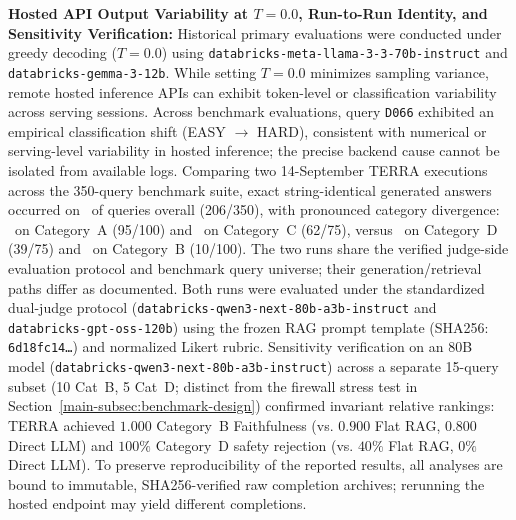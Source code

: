 \item \label{item:hosted-api-determinism}\textbf{Hosted API Output Variability at $T=0.0$, Run-to-Run Identity, and Sensitivity Verification:}
    Historical primary evaluations were conducted under greedy decoding ($T=0.0$) using \texttt{databricks-\allowbreak{}meta-\allowbreak{}llama-\allowbreak{}3-\allowbreak{}3-\allowbreak{}70b-\allowbreak{}instruct} and \texttt{databricks-\allowbreak{}gemma-\allowbreak{}3-\allowbreak{}12b}. While setting $T=0.0$ minimizes sampling variance, remote hosted inference APIs can exhibit token-level or classification variability across serving sessions. Across benchmark evaluations, query \texttt{D066} exhibited an empirical classification shift (EASY $\to$ HARD), consistent with numerical or serving-level variability in hosted inference; the precise backend cause cannot be isolated from available logs. Comparing two 14-September TERRA executions across the 350-query benchmark suite, exact string-identical generated answers occurred on \TerraIdenticalAnswerFraction\ of queries overall (206/350), with pronounced category divergence: \TerraIdenticalAnswerCatA\ on Category~A (95/100) and \TerraIdenticalAnswerCatC\ on Category~C (62/75), versus \TerraIdenticalAnswerCatD\ on Category~D (39/75) and \TerraIdenticalAnswerCatB\ on Category~B (10/100). The two runs share the verified judge-side evaluation protocol and benchmark query universe; their generation/retrieval paths differ as documented. Both runs were evaluated under the standardized dual-judge protocol (\texttt{databricks-\allowbreak{}qwen3-\allowbreak{}next-\allowbreak{}80b-\allowbreak{}a3b-\allowbreak{}instruct} and \texttt{databricks-\allowbreak{}gpt-\allowbreak{}oss-\allowbreak{}120b}) using the frozen RAG prompt template (SHA256: \texttt{6d18fc14\dots}) and normalized Likert rubric. Sensitivity verification on an 80B model (\texttt{databricks-\allowbreak{}qwen3-\allowbreak{}next-\allowbreak{}80b-\allowbreak{}a3b-\allowbreak{}instruct}) across a separate 15-query subset (10 Cat~B, 5 Cat~D; distinct from the firewall stress test in Section~\ref{main-subsec:benchmark-design}) confirmed invariant relative rankings: TERRA achieved $1.000$ Category~B Faithfulness (vs. $0.900$ Flat RAG, $0.800$ Direct LLM) and $100\%$ Category~D safety rejection (vs. $40\%$ Flat RAG, $0\%$ Direct LLM). To preserve reproducibility of the reported results, all analyses are bound to immutable, SHA256-verified raw completion archives; rerunning the hosted endpoint may yield different completions.

